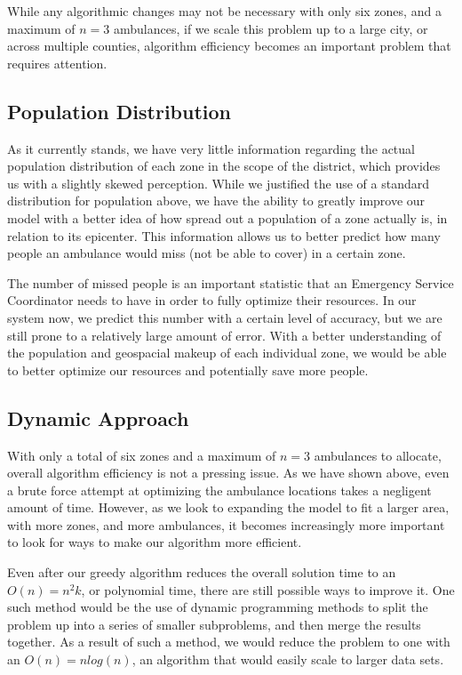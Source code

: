 \documentclass[notitlepage, 12pt]{article}
\begin{document}
While any algorithmic changes may not be necessary with only six zones, and a maximum of $n = 3$ ambulances, if we scale this problem up to a large city, or across multiple counties, algorithm efficiency becomes an important problem that requires attention.

\subsection{Population Distribution}
As it currently stands, we have very little information regarding the actual population distribution of each zone in the scope of the district, which provides us with a slightly skewed perception. While we justified the use of a standard distribution for population above, we have the ability to greatly improve our model with a better idea of how spread out a population of a zone actually is, in relation to its epicenter. This information allows us to better predict how many people an ambulance would miss (not be able to cover) in a certain zone.

The number of missed people is an important statistic that an Emergency Service Coordinator needs to have in order to fully optimize their resources. In our system now, we predict this number with a certain level of accuracy, but we are still prone to a relatively large amount of error. With a better understanding of the population and geospacial makeup of each individual zone, we would be able to better optimize our resources and potentially save more people.

\subsection{Dynamic Approach}
With only a total of six zones and a maximum of $n = 3$ ambulances to allocate, overall algorithm efficiency is not a pressing issue. As we have shown above, even a brute force attempt at optimizing the ambulance locations takes a negligent amount of time. However, as we look to expanding the model to fit a larger area, with more zones, and more ambulances, it becomes increasingly more important to look for ways to make our algorithm more efficient.

Even after our greedy algorithm reduces the overall solution time to an $O(n) = n^2k$, or polynomial time, there are still possible ways to improve it. One such method would be the use of dynamic programming methods to split the problem up into a series of smaller subproblems, and then merge the results together. As a result of such a method, we would reduce the problem to one with an $O(n) = nlog(n)$, an algorithm that would easily scale to larger data sets.
\end{document}
